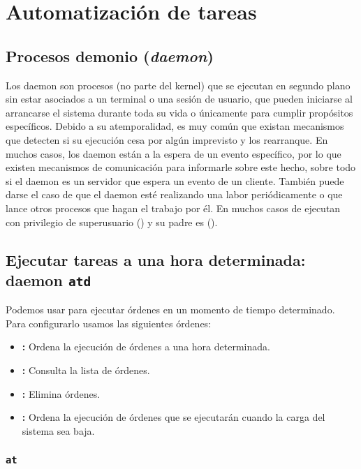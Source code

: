 \section{Automatización de tareas}

\subsection{Procesos demonio (\emph{daemon})}

Los daemon son procesos (no parte del kernel) que se ejecutan en segundo plano sin estar asociados a un terminal o una sesión de usuario, que pueden iniciarse al arrancarse el sistema durante toda su vida o únicamente para cumplir propósitos específicos.
Debido a su atemporalidad, es muy común que existan mecanismos que detecten si su ejecución cesa por algún imprevisto y los rearranque.
En muchos casos, los daemon están a la espera de un evento específico, por lo que existen mecanismos de comunicación para informarle sobre este hecho, sobre todo si el daemon es un servidor que espera un evento de un cliente.
También puede darse el caso de que el daemon esté realizando una labor periódicamente o que lance otros procesos que hagan el trabajo por él.
En muchos casos de ejecutan con privilegio de superusuario () y su padre es  ().

\subsection{Ejecutar tareas a una hora determinada: daemon \texttt{atd}}

Podemos usar  para ejecutar órdenes en un momento de tiempo determinado.
Para configurarlo usamos las siguientes órdenes:

\begin{itemize}
	\item{}\textbf{:} Ordena la ejecución de órdenes a una hora determinada.
	\item{}\textbf{:} Consulta la lista de órdenes.
	\item{}\textbf{:} Elimina órdenes.
	\item{}\textbf{:} Ordena la ejecución de órdenes que se ejecutarán cuando la carga del sistema sea baja.
\end{itemize}

\subsubsection{\texttt{at}}

